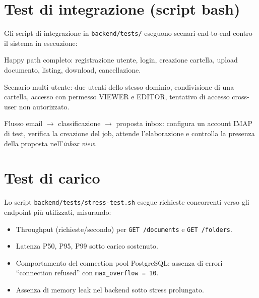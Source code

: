 
\section{Test di integrazione (script bash)}
\label{sec:integration_tests}

Gli script di integrazione in \texttt{backend/tests/} eseguono scenari end-to-end
contro il sistema in esecuzione:

\begin{description}[leftmargin=*]
    \item[\texttt{test.sh}] Happy path completo: registrazione utente, login, creazione
          cartella, upload documento, listing, download, cancellazione.
    \item[\texttt{test\_scenario.sh}] Scenario multi-utente: due utenti dello stesso
          dominio, condivisione di una cartella, accesso con permesso VIEWER e EDITOR,
          tentativo di accesso cross-user non autorizzato.
    \item[\texttt{test\_agent\_scenario.sh}] Flusso email $\rightarrow$ classificazione
          $\rightarrow$ proposta inbox: configura un account IMAP di test, verifica la
          creazione del job, attende l'elaborazione e controlla la presenza della proposta
          nell'\emph{inbox view}.
\end{description}

\section{Test di carico}
\label{sec:stress_test}

Lo script \texttt{backend/tests/stress-test.sh} esegue richieste concorrenti verso gli
endpoint pi\`u utilizzati, misurando:

\begin{itemize}[leftmargin=*]
    \item Throughput (richieste/secondo) per \texttt{GET /documents} e \texttt{GET /folders}.
    \item Latenza P50, P95, P99 sotto carico sostenuto.
    \item Comportamento del connection pool PostgreSQL: assenza di errori
          ``connection refused'' con \texttt{max\_overflow = 10}.
    \item Assenza di memory leak nel backend sotto stress prolungato.
\end{itemize}

